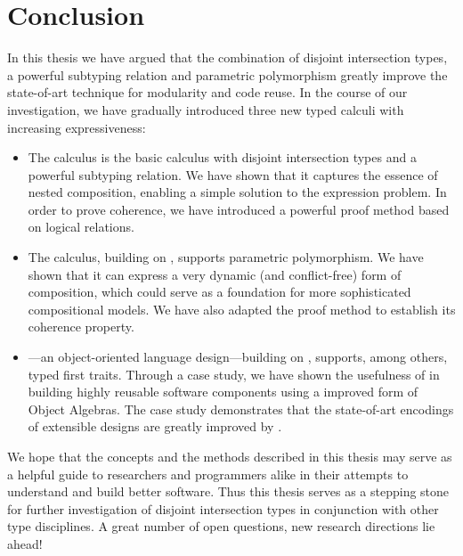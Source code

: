 \chapter{Conclusion}
\label{chap:conclusion}


In this thesis we have argued that the combination of disjoint intersection
types, a powerful subtyping relation and parametric polymorphism greatly improve
the state-of-art technique for modularity and code reuse. In the course of our
investigation, we have gradually introduced three new typed calculi with
increasing expressiveness:
\begin{itemize}
\item The \namee calculus is the basic calculus with disjoint intersection types
  and a powerful subtyping relation. We have shown that it captures the essence
  of nested composition, enabling a simple solution to the expression problem.
  In order to prove coherence, we have introduced a powerful proof method based
  on logical relations.
\item The \fnamee calculus, building on \namee, supports parametric
  polymorphism. We have shown that it can express a very dynamic (and
  conflict-free) form of composition, which could serve as a foundation for more
  sophisticated compositional models. We have also adapted the proof method to
  establish its coherence property.
\item \sedel---an object-oriented language design---building on \fnamee,
  supports, among others, typed first traits. Through a case study, we have
  shown the usefulness of \fnamee in building highly reusable software
  components using a improved form of Object Algebras. The case study
  demonstrates that the state-of-art encodings of extensible designs are greatly
  improved by \fnamee.
\end{itemize}

We hope that the concepts and the methods described in this thesis may serve as
a helpful guide to researchers and programmers alike in their attempts to
understand and build better software. Thus this thesis serves as a stepping
stone for further investigation of disjoint intersection types in conjunction
with other type disciplines. A great number of open questions, new research
directions lie ahead!




